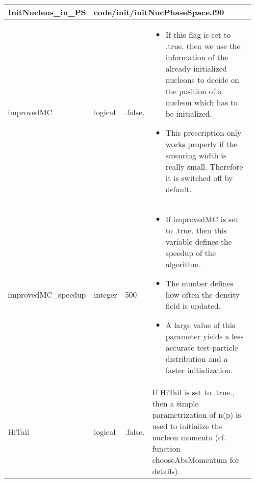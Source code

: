 \documentclass{article}
\begin{document}

\begin{longtable}{llll}
\toprule
\textbf{\large{InitNucleus\_in\_PS}} & \multicolumn{3}{l}{\footnotesize{code/init/initNucPhaseSpace.f90}}\\*
\midrule
\endfirsthead
\midrule
\endhead
improvedMC & \begin{minipage}[t]{2cm}logical\end{minipage} & \begin{minipage}[t]{2cm}.false.\end{minipage} & \begin{minipage}[t]{12cm}\begin{itemize}\leftmargin0em\itemindent0pt\item If this flag is set to .true. then we use the information of the already   initialized nucleons to decide on the position of a nucleon which has to   be initialized.\item This prescription only works properly if the smearing width is really   small. Therefore it is switched off by default.\end{itemize}\end{minipage}\\*
\midrule
improvedMC\_speedup & \begin{minipage}[t]{2cm}integer\end{minipage} & \begin{minipage}[t]{2cm}500\end{minipage} & \begin{minipage}[t]{12cm}\begin{itemize}\leftmargin0em\itemindent0pt\item If improvedMC  is set to .true. then this variable defines   the speedup of the algorithm.\item The number defines how often the density field is updated.\item A large value of  this parameter yields a less accurate test-particle   distribution and a faster initialization.\end{itemize}\end{minipage}\\*
\midrule
HiTail & \begin{minipage}[t]{2cm}logical\end{minipage} & \begin{minipage}[t]{2cm}.false.\end{minipage} & \begin{minipage}[t]{12cm}If HiTail is set to .true., then a simple parametrization of n(p) is used to initialize the nucleon momenta (cf. function chooseAbsMomentum for details).\end{minipage}\\*

\end{longtable}
\end{document}
